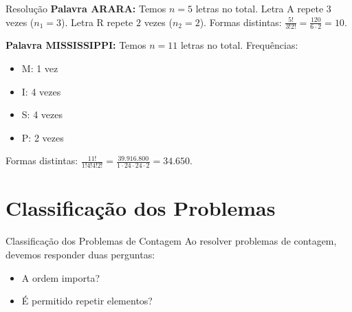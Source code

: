 \documentclass[9pt]{beamer}
\begin{document}
\begin{frame}{Resolução}
\textbf{Palavra ARARA:}
Temos $n = 5$ letras no total.
Letra A repete $3$ vezes ($n_1 = 3$).
Letra R repete $2$ vezes ($n_2 = 2$).
Formas distintas: $\frac{5!}{3!2!} = \frac{120}{6 \cdot 2} = 10$.

\vspace{0.4cm}

\textbf{Palavra MISSISSIPPI:}
Temos $n = 11$ letras no total.
Frequências:
\begin{itemize}
    \item M: 1 vez
    \item I: 4 vezes
    \item S: 4 vezes
    \item P: 2 vezes
\end{itemize}
Formas distintas: $\frac{11!}{1! 4! 4! 2!} = \frac{39.916.800}{1 \cdot 24 \cdot 24 \cdot 2} = 34.650$.
\end{frame}
\section{Classificação dos Problemas}
\begin{frame}{Classificação dos Problemas de Contagem}
Ao resolver problemas de contagem, devemos responder duas perguntas:

\begin{itemize}
    \item A ordem importa?
    \item É permitido repetir elementos?
\end{itemize}

\begin{center}
\end{center}
\end{frame}
\end{document}
